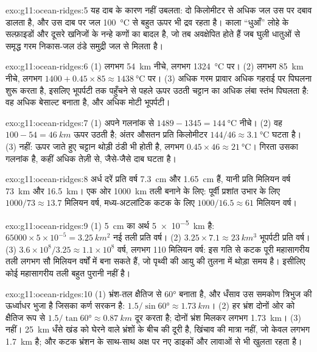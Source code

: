 \begin{solution}{exo:g11:ocean-ridges:5}
यह दाब के कारण नहीं उबलता: दो किलोमीटर से अधिक जल उस पर
दबाव डालता है, और उस दाब पर जल \qty{100}{\celsius} से बहुत ऊपर भी
द्रव रहता है। काला ``धुआँ'' लोहे के सल्फ़ाइडों और
दूसरे खनिजों के नन्हे कणों का बादल है, जो तब अवक्षेपित होते हैं जब घुली धातुओं से समृद्ध गरम
निकास-जल ठंडे समुद्री जल से मिलता है।
\end{solution}

\begin{solution}{exo:g11:ocean-ridges:6}
(1) लगभग \qty{54}{km} नीचे, लगभग \qty{1324}{\celsius} पर। (2) लगभग
\qty{85}{km} नीचे, लगभग $1400 + 0.45 \times 85 \approx
\qty{1438}{\celsius}$ पर। (3) अधिक गरम प्रावार अधिक गहराई पर पिघलना शुरू करता है, इसलिए
भूपर्पटी तक पहुँचने से पहले ऊपर उठती चट्टान का अधिक लंबा स्तंभ पिघलता है: वह अधिक
बेसाल्ट बनाता है, और अधिक मोटी भूपर्पटी।
\end{solution}

\begin{solution}{exo:g11:ocean-ridges:7}
(1) अपने गलनांक से $1489 - 1345 = \qty{144}{\celsius}$ नीचे।
(2) वह $100 - 54 = \qty{46}{km}$ ऊपर उठती है; अंतर औसतन
प्रति किलोमीटर $144/46 \approx \qty{3.1}{\celsius}$ घटता है। (3) नहीं: ऊपर
जाते हुए चट्टान थोड़ी ठंडी भी होती है, लगभग $0.45 \times 46 \approx
\qty{21}{\celsius}$। गिरता उसका गलनांक है, कहीं अधिक तेज़ी से,
जैसे-जैसे दाब घटता है।
\end{solution}

\begin{solution}{exo:g11:ocean-ridges:8}
अर्ध दरें प्रति वर्ष \qty{7.3}{cm} और \qty{1.65}{cm} हैं, यानी
प्रति मिलियन वर्ष \qty{73}{km} और \qty{16.5}{km}। एक ओर \qty{1000}{km}
तली बनाने के लिए: पूर्वी प्रशांत उभार के लिए $1000/73 \approx 13.7$ मिलियन वर्ष,
मध्य-अटलांटिक कटक के लिए $1000/16.5 \approx 61$ मिलियन वर्ष।
\end{solution}

\begin{solution}{exo:g11:ocean-ridges:9}
(1) \qty{5}{cm} का अर्थ \qty{5e-5}{km} है: $65000 \times 5 \times 10^{-5} =
\qty{3.25}{km^2}$ नई तली प्रति वर्ष। (2) $3.25 \times 7.1 \approx
\qty{23}{km^3}$ भूपर्पटी प्रति वर्ष। (3) $3.6 \times 10^8 / 3.25 \approx 1.1
\times 10^8$ वर्ष, लगभग 110 मिलियन वर्ष: इस गति से कटक
पूरी महासागरीय तली लगभग सौ मिलियन वर्षों में बना सकते हैं, जो पृथ्वी की आयु की तुलना में
थोड़ा समय है। इसीलिए कोई महासागरीय तली बहुत पुरानी नहीं है।
\end{solution}

\begin{solution}{exo:g11:ocean-ridges:10}
(1) भ्रंश-तल क्षैतिज से \ang{60} बनाता है, और धँसाव उस समकोण त्रिभुज की
ऊर्ध्वाधर भुजा है जिसका कर्ण सरकन है:
$1.5/\sin\ang{60} \approx \qty{1.73}{km}$। (2) हर भ्रंश दोनों ओर को
क्षैतिज रूप से $1.5/\tan\ang{60} \approx \qty{0.87}{km}$ दूर करता है; दोनों
भ्रंश मिलकर लगभग \qty{1.73}{km}। (3) नहीं। \qty{25}{km} धँसे खंड को घेरने वाले
भ्रंशों के बीच की दूरी है, खिंचाव की मात्रा नहीं, जो
केवल लगभग \qty{1.7}{km} है; और कटक भ्रंशन के साथ-साथ अक्ष पर नए डाइकों और लावाओं से भी
खुलता रहता है।
\end{solution}

